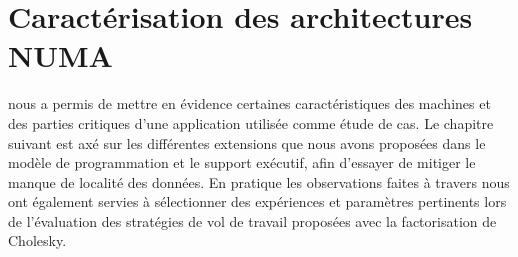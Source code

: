 

\chapter{Caractérisation des architectures NUMA}\label{chap:contrib:characterization}
\chaptertoc






\bigskip
\bigskip

\outil nous a permis de mettre en évidence certaines caractéristiques des machines et des parties critiques d'une application utilisée comme étude de cas.
Le chapitre suivant est axé sur les différentes extensions que nous avons proposées dans le modèle de programmation et le support exécutif, afin d'essayer de mitiger le manque de localité des données.
En pratique les observations faites à travers \outil nous ont également servies à sélectionner des expériences et paramètres pertinents lors de l'évaluation des stratégies de vol de travail proposées avec la factorisation de Cholesky.
